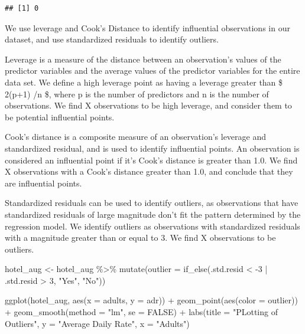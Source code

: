 \documentclass[
]{article}
\newenvironment{Shaded}{\begin{snugshade}}{\end{snugshade}}
\newcommand{\AttributeTok}[1]{\textcolor[rgb]{0.77,0.63,0.00}{#1}}
\newcommand{\ConstantTok}[1]{\textcolor[rgb]{0.00,0.00,0.00}{#1}}
\newcommand{\DecValTok}[1]{\textcolor[rgb]{0.00,0.00,0.81}{#1}}
\newcommand{\FunctionTok}[1]{\textcolor[rgb]{0.00,0.00,0.00}{#1}}
\newcommand{\NormalTok}[1]{#1}
\newcommand{\OtherTok}[1]{\textcolor[rgb]{0.56,0.35,0.01}{#1}}
\newcommand{\SpecialCharTok}[1]{\textcolor[rgb]{0.00,0.00,0.00}{#1}}
\newcommand{\StringTok}[1]{\textcolor[rgb]{0.31,0.60,0.02}{#1}}
\begin{document}
\begin{verbatim}
## [1] 0
\end{verbatim}

We use leverage and Cook's Distance to identify influential observations
in our dataset, and use standardized residuals to identify outliers.

Leverage is a measure of the distance between an observation's values of
the predictor variables and the average values of the predictor
variables for the entire data set. We define a high leverage point as
having a leverage greater than \$ 2(p+1) /n \$, where p is the number of
predictors and n is the number of observations. We find X observations
to be high leverage, and consider them to be potential influential
points.

Cook's distance is a composite measure of an observation's leverage and
standardized residual, and is used to identify influential points. An
observation is considered an influential point if it's Cook's distance
is greater than 1.0. We find X observations with a Cook's distance
greater than 1.0, and conclude that they are influential points.

Standardized residuals can be used to identify outliers, as observations
that have standardized residuals of large magnitude don't fit the
pattern determined by the regression model. We identify outliers as
observations with standardized residuals with a magnitude greater than
or equal to 3. We find X observations to be outliers.

\begin{Shaded}
\begin{Highlighting}[]
\NormalTok{hotel\_aug }\OtherTok{\textless{}{-}}\NormalTok{ hotel\_aug }\SpecialCharTok{\%\textgreater{}\%}
\FunctionTok{mutate}\NormalTok{(}\AttributeTok{outlier =} \FunctionTok{if\_else}\NormalTok{(.std.resid }\SpecialCharTok{\textless{}} \SpecialCharTok{{-}}\DecValTok{3} \SpecialCharTok{|}\NormalTok{ .std.resid }\SpecialCharTok{\textgreater{}} \DecValTok{3}\NormalTok{, }\StringTok{"Yes"}\NormalTok{, }\StringTok{"No"}\NormalTok{))}

\FunctionTok{ggplot}\NormalTok{(hotel\_aug, }\FunctionTok{aes}\NormalTok{(}\AttributeTok{x =}\NormalTok{ adults, }\AttributeTok{y =}\NormalTok{ adr)) }\SpecialCharTok{+} \FunctionTok{geom\_point}\NormalTok{(}\FunctionTok{aes}\NormalTok{(}\AttributeTok{color =}\NormalTok{ outlier)) }\SpecialCharTok{+}
\FunctionTok{geom\_smooth}\NormalTok{(}\AttributeTok{method =} \StringTok{"lm"}\NormalTok{, }\AttributeTok{se =} \ConstantTok{FALSE}\NormalTok{) }\SpecialCharTok{+} \FunctionTok{labs}\NormalTok{(}\AttributeTok{title =} \StringTok{"PLotting of Outliers"}\NormalTok{,}
      \AttributeTok{y =} \StringTok{"Average Daily Rate"}\NormalTok{,}
      \AttributeTok{x =} \StringTok{"Adults"}\NormalTok{) }
\end{Highlighting}
\end{Shaded}
\end{document}
